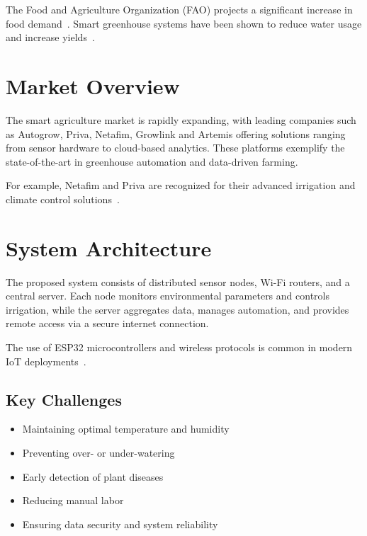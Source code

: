 \documentclass[12pt,a4paper]{article}
\begin{document}
The Food and Agriculture Organization (FAO) projects a significant increase in food demand~\cite{FAO2017}. Smart greenhouse systems have been shown to reduce water usage and increase yields~\cite{IoTGreenhouse2022,SmartAgReview}.


\section{Market Overview}
The smart agriculture market is rapidly expanding, with leading companies such as Autogrow, Priva, Netafim, Growlink and Artemis offering solutions ranging from sensor hardware to cloud-based analytics. These platforms exemplify the state-of-the-art in greenhouse automation and data-driven farming.

For example, Netafim and Priva are recognized for their advanced irrigation and climate control solutions~\cite{Netafim2020,Priva2021}.


\section{System Architecture}
The proposed system consists of distributed sensor nodes, Wi-Fi routers, and a central server. Each node monitors environmental parameters and controls irrigation, while the server aggregates data, manages automation, and provides remote access via a secure internet connection.

The use of ESP32 microcontrollers and wireless protocols is common in modern IoT deployments~\cite{ESP32Survey}.

\subsection{Key Challenges}
\begin{itemize}
    \item Maintaining optimal temperature and humidity
    \item Preventing over- or under-watering
    \item Early detection of plant diseases
    \item Reducing manual labor
    \item Ensuring data security and system reliability
\end{itemize}
\end{document}
